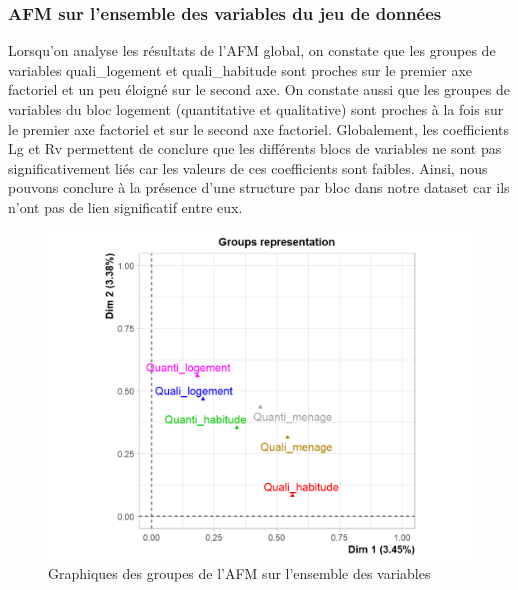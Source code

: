 \documentclass[11pt,a4paper, x11names]{article}\usepackage[]{graphicx}\usepackage[]{color}
\begin{document}
\subsubsection{AFM sur l'ensemble des variables du jeu de données}
Lorsqu’on analyse les résultats de l’AFM global, on constate que les groupes de variables quali\_logement et quali\_habitude sont proches sur le premier axe factoriel et un peu éloigné sur le second axe. On constate aussi que les groupes de variables du bloc logement (quantitative et qualitative) sont proches à la fois sur le premier axe factoriel et sur le second axe factoriel. 
Globalement, les coefficients Lg et Rv permettent de conclure que les différents blocs de variables ne sont pas significativement liés car les valeurs de ces coefficients sont faibles. Ainsi, nous pouvons conclure à la présence d’une structure par bloc dans notre dataset car ils n’ont pas de lien significatif entre eux.
\begin{figure}[H]
\centering
\includegraphics[scale=0.5]{graphiques/AFM_gglobal.png}
\caption{Graphiques des groupes de l'AFM sur l'ensemble des variables } \label{fig9:AFM2}
\end{figure}
\end{document}

